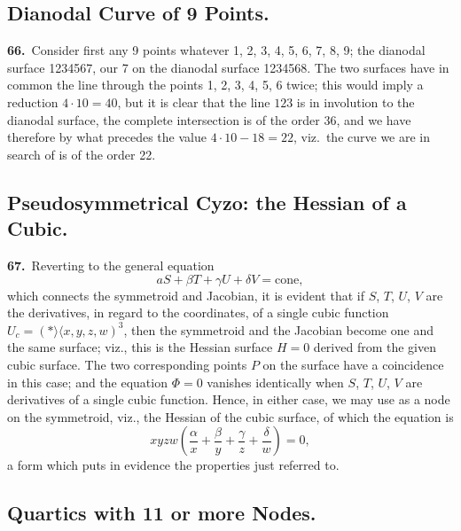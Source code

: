 \documentclass[11pt,a4paper]{article}
\newcommand{\bw}{\mathrel{\rangle\!\langle}}
\begin{document}
\subsection*{Dianodal Curve of 9 Points.}

\noindent\textbf{66.}\ Consider first any 9 points whatever 1, 2, 3, 4, 5, 6, 7, 8, 9; the dianodal surface 1234567, our 7 on the dianodal surface 1234568. The two surfaces have in common the line through the points 1, 2, 3, 4, 5, 6 twice; this would imply a reduction $4 \cdot 10 = 40$, but it is clear that the line $123$ is in involution to the dianodal surface, the complete intersection is of the order 36, and we have therefore by what precedes the value $4 \cdot 10 - 18 = 22$, viz.\ the curve we are in search of is of the order 22.

\subsection*{Pseudosymmetrical Cyzo: the Hessian of a Cubic.}

\noindent\textbf{67.}\ Reverting to the general equation
\[
aS + \beta T + \gamma U + \delta V = \text{cone},
\]
which connects the symmetroid and Jacobian, it is evident that if $S$, $T$, $U$, $V$ are the derivatives, in regard to the coordinates, of a single cubic function $U_c = (\ast \bw x, y, z, w)^3$, then the symmetroid and the Jacobian become one and the same surface; viz., this is the Hessian surface $H = 0$ derived from the given cubic surface. The two corresponding points $P$ on the surface have a coincidence in this case; and the equation $\Phi = 0$ vanishes identically when $S$, $T$, $U$, $V$ are derivatives of a single cubic function. Hence, in either case, we may use as a node on the symmetroid, viz., the Hessian of the cubic surface, of which the equation is
\[
xyzw\left(\frac{\alpha}{x} + \frac{\beta}{y} + \frac{\gamma}{z} + \frac{\delta}{w}\right) = 0,
\]
a form which puts in evidence the properties just referred to.

\newpage
\setcounter{page}{158}

\subsection*{Quartics with 11 or more Nodes.}
\end{document}
